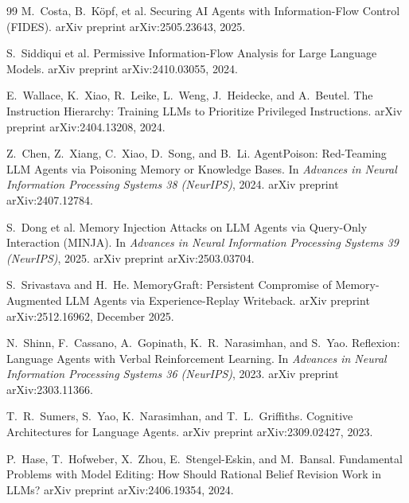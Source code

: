 \documentclass[11pt]{article}
\begin{document}
\begin{thebibliography}{99}
M.~Costa, B.~K\"opf, et al.
\newblock Securing AI Agents with Information-Flow Control (FIDES).
\newblock arXiv preprint arXiv:2505.23643, 2025.

S.~Siddiqui et al.
\newblock Permissive Information-Flow Analysis for Large Language Models.
\newblock arXiv preprint arXiv:2410.03055, 2024.

E.~Wallace, K.~Xiao, R.~Leike, L.~Weng, J.~Heidecke, and A.~Beutel.
\newblock The Instruction Hierarchy: Training LLMs to Prioritize Privileged Instructions.
\newblock arXiv preprint arXiv:2404.13208, 2024.

Z.~Chen, Z.~Xiang, C.~Xiao, D.~Song, and B.~Li.
\newblock AgentPoison: Red-Teaming LLM Agents via Poisoning Memory or Knowledge Bases.
\newblock In \emph{Advances in Neural Information Processing Systems 38 (NeurIPS)}, 2024.
\newblock arXiv preprint arXiv:2407.12784.

S.~Dong et al.
\newblock Memory Injection Attacks on LLM Agents via Query-Only Interaction (MINJA).
\newblock In \emph{Advances in Neural Information Processing Systems 39 (NeurIPS)}, 2025.
\newblock arXiv preprint arXiv:2503.03704.

S.~Srivastava and H.~He.
\newblock MemoryGraft: Persistent Compromise of Memory-Augmented LLM Agents via Experience-Replay Writeback.
\newblock arXiv preprint arXiv:2512.16962, December 2025.

N.~Shinn, F.~Cassano, A.~Gopinath, K.~R.~Narasimhan, and S.~Yao.
\newblock Reflexion: Language Agents with Verbal Reinforcement Learning.
\newblock In \emph{Advances in Neural Information Processing Systems 36 (NeurIPS)}, 2023.
\newblock arXiv preprint arXiv:2303.11366.

T.~R.~Sumers, S.~Yao, K.~Narasimhan, and T.~L.~Griffiths.
\newblock Cognitive Architectures for Language Agents.
\newblock arXiv preprint arXiv:2309.02427, 2023.

P.~Hase, T.~Hofweber, X.~Zhou, E.~Stengel-Eskin, and M.~Bansal.
\newblock Fundamental Problems with Model Editing: How Should Rational Belief Revision Work in LLMs?
\newblock arXiv preprint arXiv:2406.19354, 2024.

\end{thebibliography}
\end{document}
